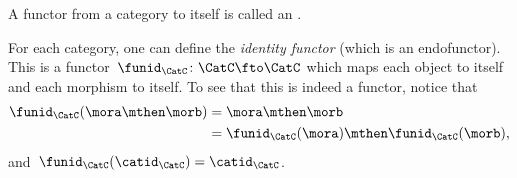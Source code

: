 \begin{remark}
    A functor from a category to itself is called an \emph{}.
\end{remark}

\begin{example}
    For each category, one can define the \emph{identity functor} (which is an endofunctor).
    This is a functor~$\funid_\CatC \colon \CatC \fto \CatC$ which maps each object to itself and each morphism to itself.
    To see that this is indeed a functor, notice that
    \begin{equation*}
        \begin{aligned}
            \funid_\CatC(\mora \mthen \morb)&=\mora \mthen \morb\\
            &=\funid_\CatC(\mora)\mthen \funid_\CatC(\morb),
        \end{aligned}
    \end{equation*}
    and~$\funid_\CatC(\catid_\CatC)=\catid_\CatC$.
\end{example}

